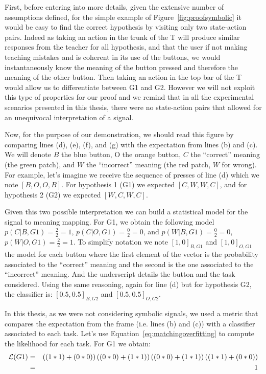 First, before entering into more details, given the extensive number of assumptions defined, for the simple example of Figure~\ref{fig:proofsymbolic} it would be easy to find the correct hypothesis by visiting only two state-action pairs. Indeed as taking an action in the trunk of the T will produce similar responses from the teacher for all hypothesis, and that the user if not making teaching mistakes and is coherent in its use of the buttons, we would instantaneously know the meaning of the button pressed and therefore the meaning of the other button. Then taking an action in the top bar of the T would allow us to differentiate between G1 and G2. However we will not exploit this type of properties for our proof and we remind that in all the experimental scenarios presented in this thesis, there were no state-action pairs that allowed for an unequivocal interpretation of a signal.

Now, for the purpose of our demonstration, we should read this figure by comparing lines (d), (e), (f), and (g) with the expectation from lines (b) and (c). We will denote $B$ the blue button, O the orange button, $C$ the ``correct'' meaning (the green patch), and $W$ the ``incorrect'' meaning (the red patch, $W$ for wrong). For example, let's imagine we receive the sequence of presses of line (d) which we note $[B,O,O,B]$. For hypothesis 1 (G1) we expected $[C,W,W,C]$, and for hypothesis 2 (G2) we expected $[W,C,W,C]$. 

Given this two possible interpretation we can build a statistical model for the signal to meaning mapping. For G1, we obtain the following model $p(C|B, G1) = \frac{2}{2} = 1$, $p(C|O, G1) = \frac{0}{2} = 0$, and $p(W|B, G1) = \frac{0}{2} = 0$, $p(W|O, G1) = \frac{2}{2} = 1$. To simplify notation we note $[1,0]_{B,G1}$ and $[1,0]_{O,G1}$ the model for each button where the first element of the vector is the probability associated to the ``correct'' meaning and the second is the one associated to the ``incorrect'' meaning. And the underscript details the button and the task considered. Using the same reasoning, again for line (d) but for hypothesis G2, the classifier is: $[0.5,0.5]_{B,G2}$ and $[0.5,0.5]_{O,G2}$.

In this thesis, as we were not considering symbolic signals, we used a metric that compares the expectation from the frame (i.e. lines (b) and (c)) with a classifier associated to each task. Let's use Equation~\ref{eq:matchingoverfitting} to compute the likelihood for each task. For G1 we obtain:
%
\begin{eqnarray}
\mathcal{L}(G1) &=& \left((1*1)+(0*0)\right)\left((0*0)+(1*1)\right)\left((0*0)+(1*1)\right)\left((1*1)+(0*0)\right)  \nonumber \\
&=& 1 \nonumber
\end{eqnarray}

